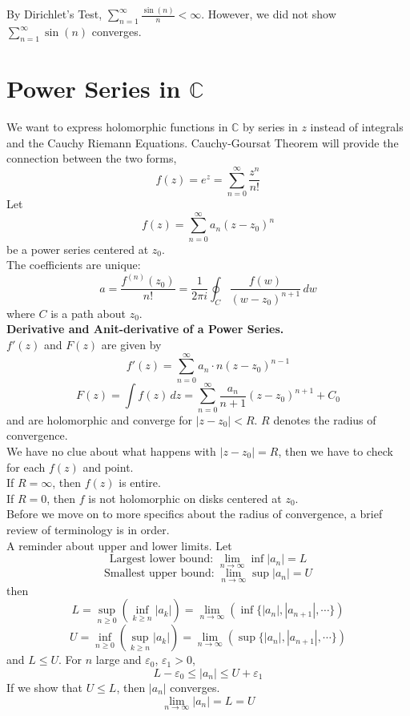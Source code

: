 \documentclass[11pt]{article}
\begin{document}
By Dirichlet's Test, $\sum_{n = 1}^{\infty} \frac{\sin(n)}{n} < \infty$. 
However, we did not show $\sum_{n = 1}^\infty\sin(n)$ converges. 
\newpage
\section{Power Series in $\mathbb{C}$}
We want to express holomorphic functions in $\mathbb{C}$ by series in $z$ instead of integrals and the Cauchy Riemann Equations. Cauchy-Goursat Theorem will provide the connection between the two forms, 
$$ f(z) = e^z = \sum_{n = 0}^{\infty} \frac{z^n}{n!} $$
Let 
$$ f(z) = \sum_{n = 0}^{\infty} a_n(z - z_0)^n $$
be a power series centered at $z_0$. \\
The coefficients are unique: 
$$ a = \frac{f^{(n)} (z_0)}{n!} = \frac{1}{2\pi i} \oint_C \frac{f(w)}{(w - z_0)^{n + 1}} \, dw$$
where $C$ is a path about $z_0$. \\
\newline
\textbf{Derivative and Anit-derivative of a Power Series.} \\
$f'(z)$ and $F(z)$ are given by 
$$f'(z) = \sum_{n = 0}^{\infty} a_n \cdot n(z-z_0)^{n -1}$$
$$F(z) = \int f(z) \, dz = \sum_{n = 0}^{\infty} \frac{a_n}{n + 1}(z - z_0)^{n + 1} + C_0$$
and are holomorphic and converge for $|z -z _0| < R$. $R$ denotes the radius of convergence. \\
We have no clue about what happens with $|z - z_0| = R$, then we have to check for each $f(z)$ and point. \\
If $R = \infty$, then $f(z)$ is entire. \\
If $R = 0$, then $f$ is not holomorphic on disks centered at $z_0$. \\
\newline
Before we move on to more specifics about the radius of convergence, a brief review of terminology is in order. \\ 
A reminder about upper and lower limits. Let 
\begin{equation*}
\mbox{Largest lower bound: } \lim_{n \to \infty} \inf|a_n| = L
\end{equation*}
\begin{equation*}
\mbox{Smallest upper bound: }\lim_{n \to \infty} \sup|a_n| = U
\end{equation*}
then 
$$ L = \sup_{n \geqslant 0}(\inf_{k \geqslant n}|a_k|) = \lim_{n \to \infty} (\inf \{ |a_n|, |a_{n + 1}|, \cdots \})$$
$$ U = \inf_{n \geqslant 0}(\sup_{k \geqslant n}|a_k|) = \lim_{n \to \infty} (\sup \{ |a_n|, |a_{n + 1}|, \cdots \}) $$
and $L \leqslant U$. For $n$ large and $\varepsilon_0$, $\varepsilon_1 > 0$, 
$$L - \varepsilon_0 \leqslant |a_n| \leqslant U + \varepsilon_1$$
If we show that $U \leqslant L$, then $|a_n|$ converges.
$$\lim_{n \to \infty}|a_n| = L = U$$ 
\newline
\end{document}
